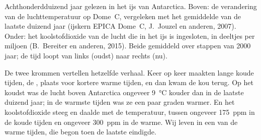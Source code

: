 \begin{omfigure}

{\small Achthonderdduizend jaar gelezen in het ijs van Antarctica. Boven:
de verandering van de luchttemperatuur op Dome~C, vergeleken met het
gemiddelde van de laatste duizend jaar (ijskern EPICA Dome~C, J.~Jouzel en
anderen, 2007). Onder: het koolstofdioxide van de lucht die in het ijs is
ingesloten, in deeltjes per miljoen (B.~Bereiter en anderen, 2015). Beide
gemiddeld over stappen van \num{2000} jaar; de tijd loopt van links
(oudst) naar rechts (nu).}
\label{fig:g9:climate-past-and-present:icecore}
\end{omfigure}

De twee krommen vertellen hetzelfde verhaal. Keer op keer maakten lange
koude tijden, de , plaats voor kortere warme tijden, en dan kwam
de kou terug. Op het koudst was de lucht boven Antarctica ongeveer
\qty{9}{\degreeCelsius} kouder dan in de laatste duizend jaar; in de
warmste tijden was ze een paar graden warmer. En het koolstofdioxide steeg
en daalde met de temperatuur, tussen ongeveer \qty{175}{ppm} in de koude
tijden en ongeveer \qty{300}{ppm} in de warme. Wij leven in een van de
warme tijden, die begon toen de laatste  eindigde.


